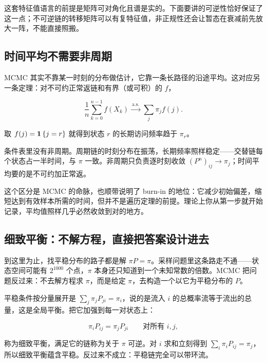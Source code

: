 这套特征值语言的前提是矩阵可对角化且谱是实的。下面要讲的可逆性恰好保证了这一点；不可逆链的转移矩阵可以有复特征值，非正规性还会让暂态在衰减前先放大一阵，不能直接照搬。

\subsection{时间平均不需要非周期}

MCMC 其实不靠某一时刻的分布做估计，它靠一条长路径的沿途平均。这对应另一条定理：对不可约正常返链和有界（或可积）的 \(f\)，

\[
\frac1n\sum_{k=0}^{n-1}f(X_k)
\xrightarrow{\ \text{a.s.}\ }
\sum_j\pi_jf(j).
\]

取 \(f(j)=\mathbf{1}\left\{j=r\right\}\) 就得到状态 \(r\) 的长期访问频率趋于 \(\pi_r\)。

条件表里没有非周期。周期链的时刻分布在振荡，长期频率照样稳定——交替链每个状态占一半时间，与 \(\pi\) 一致。非周期只负责逐时刻收敛 \((P^n)_{ij}\to\pi_j\)；时间平均要的是不可约加正常返。

这个区分是 MCMC 的命脉，也顺带说明了 burn-in 的地位：它减少初始偏差，缩短达到有效样本所需的时间，但并不是遍历定理的前提。理论上你从第一步就开始记录，平均值照样几乎必然收敛到对的地方。

\subsection{细致平衡：不解方程，直接把答案设计进去}

到这里为止，找平稳分布的路子都是解 \(\pi P=\pi\)。采样问题里这条路走不通——状态空间可能有 \(2^{1000}\) 个点，\(\pi\) 本身还只知道到一个未知常数的倍数。MCMC 把问题反过来：不去解方程求 \(\pi\)，而是给定 \(\pi\)，去构造一个以它为平稳分布的 \(P\)。

平稳条件按分量展开是 \(\sum_j\pi_jP_{ji}=\pi_i\)，说的是流入 \(i\) 的总概率流等于流出的总量，这是全局平衡。把它加强到每一对状态上：

\[
\pi_iP_{ij}=\pi_jP_{ji}
\qquad\text{对所有 }i,j,
\]

称为细致平衡，满足它的链称为关于 \(\pi\) 可逆。对 \(i\) 求和立刻得到 \(\sum_i\pi_iP_{ij}=\pi_j\)，所以细致平衡蕴含平稳。反过来不成立：平稳链完全可以带环流。

